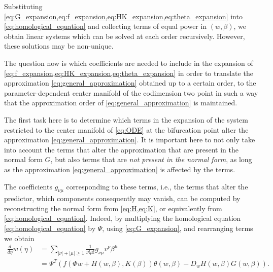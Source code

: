Substituting
\cref{eq:G_expansion,eq:f_expansion,eq:HK_expansion,eq:theta_expansion} into
\cref{eq:homological_equation} and collecting terms of equal power in $(w,\beta)$, we
obtain linear systems which can be solved at each order recursively. However,
these solutions may be non-unique.

The question now is which coefficients are needed to include in the expansion of
\cref{eq:f_expansion,eq:HK_expansion,eq:theta_expansion} in order to translate the 
approximation \cref{eq:general_approximation} obtained up to a certain order,
to the parameter-dependent center manifold of the codimension two point in such
a way that the approximation order of \cref{eq:general_approximation} is maintained.

The first task here is to determine which terms in the expansion of the 
system restricted to the center manifold of \cref{eq:ODE} at the bifurcation
point alter the approximation \cref{eq:general_approximation}.  It is
important here to not only take into account the terms that alter the
approximation that are present in the normal form $G$, but also terms that are
\emph{not present in the normal form}, as long as the approximation
\cref{eq:general_approximation} is affected by the terms. 

The coefficients $g_{\nu\mu}$ corresponding to these terms, i.e., the terms that
alter the predictor, which components consequently may vanish, can be computed
by reconstructing the normal form from \cref{eq:H,eq:K}, or equivalently from
\cref{eq:homological_equation}. Indeed, by multiplying the homological equation
\cref{eq:homological_equation} by $\Psi$, using \cref{eq:G_expansion}, and
rearranging terms we obtain
\begin{align*}
\frac{d}{d\eta} w(\eta) &=  \sum_{|\nu|+|\mu| \geq 1} \frac{1}{\nu!\mu!} g_{\nu\mu} v^\nu \beta^\mu \\ 
                        &= \Psi^T (f(\Phi w + H(w,\beta), K(\beta)) \theta(w, \beta) - D_wH(w, \beta)G(w,\beta)).
\end{align*}


